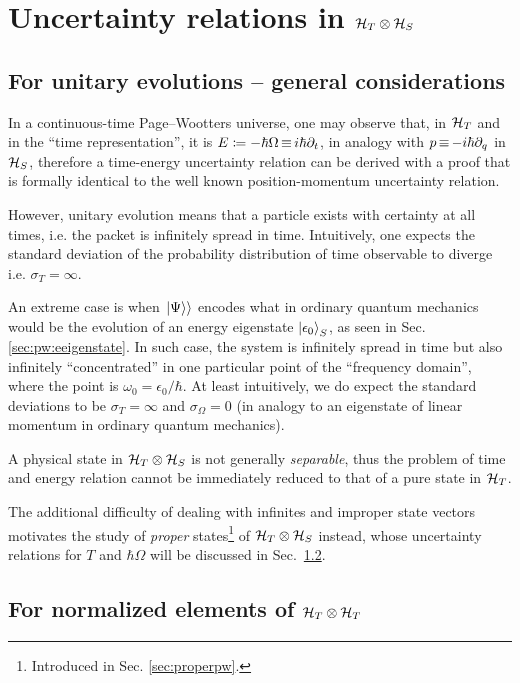 \section{Uncertainty relations in $\mathcal{H}_T \otimes \mathcal{H}_S$}\label{sec:pw:uncertainty}

\subsection{For unitary evolutions -- general considerations}
\label{sec:pw:unitary-general}

In a continuous-time Page--Wootters universe,
one may observe that,
in $\mathcal{H}_T$ and in the ``time representation'',
it is $E \coloneqq -\hbar{\Omega} \operatorname*{\equiv} i\hbar\partial_{t}$,
in analogy with ${p} \operatorname*{\equiv} -i\hbar\partial_{q}$ in $\mathcal{H}_S$,
therefore a time-energy uncertainty relation can be derived
with a proof that is formally identical to the well known
position-momentum uncertainty relation.

However, unitary evolution means that a particle exists with
certainty at all times, i.e. the packet
is infinitely spread in time.
Intuitively,
one expects the standard deviation
of the probability distribution of time observable
to diverge i.e.
$\sigma_T = \infty$.

An extreme case is when $\left.\left| \Psi \right\rangle\right\rangle$ encodes what in ordinary quantum mechanics would be the evolution
of an energy eigenstate $\ket{\epsilon_0}_S$, as seen in Sec. \ref{sec:pw:eeigenstate}.
In such case, the system is infinitely spread in time but also infinitely
``concentrated'' in one particular point of the ``frequency domain'',
where the point is $\omega_0 = \epsilon_{0}/\hbar$.
At least intuitively, we do expect the standard deviations to be $\sigma_T = \infty$
and $\sigma_{\Omega} = 0$
(in analogy to an eigenstate of linear momentum in ordinary quantum mechanics).

A physical state in $\mathcal{H}_T \otimes \mathcal{H}_S$ is not generally
\emph{separable},
thus
the problem of time and energy relation cannot be immediately reduced to that of
a pure state in $\mathcal{H}_T$.

The additional difficulty of dealing with infinites and improper state vectors
motivates the study of \emph{proper} states\footnote{
  Introduced in Sec. \ref{sec:properpw}.
}
of $\mathcal{H}_T \otimes \mathcal{H}_S$
instead, whose uncertainty relations for $T$ and $\hbar\Omega$ will be discussed in Sec.~\ref{sec:for-normalized-elements}.

\subsection{For normalized elements of $\mathcal{H}_T \otimes \mathcal{H}_T$}\label{sec:for-normalized-elements}

